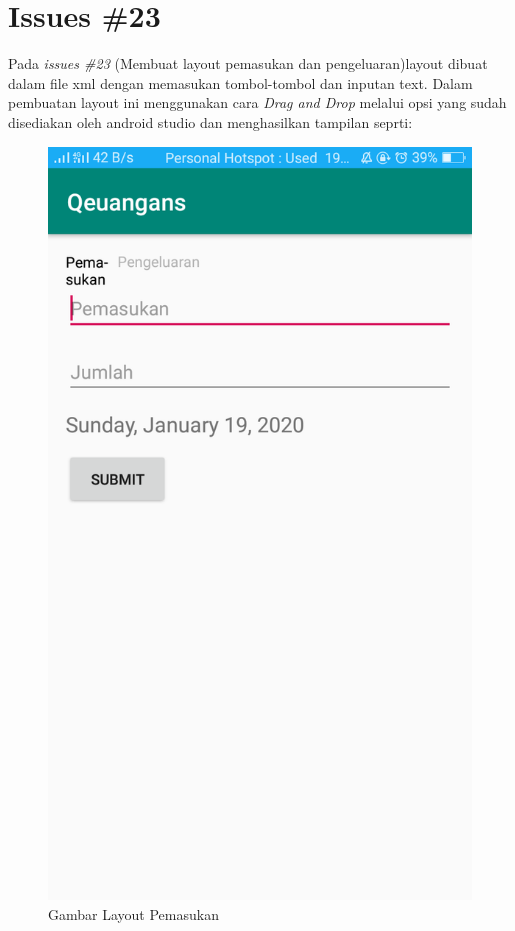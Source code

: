 \section{Issues \#23}
Pada \textit{issues \#23} (Membuat layout pemasukan dan pengeluaran)layout dibuat dalam file xml dengan memasukan tombol-tombol dan inputan text. Dalam pembuatan layout ini menggunakan cara \textit{Drag and Drop} melalui opsi yang sudah disediakan oleh android studio dan menghasilkan tampilan seprti: 
\begin{figure}
    \centering
    \includegraphics[scale = 0.3]{pictures/pemasukan_layout.png}
    \caption{Gambar Layout Pemasukan}
\end{figure}
